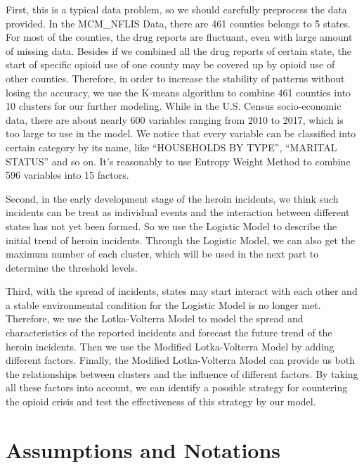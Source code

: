 \documentclass[12pt]{article}
\begin{document}
First, this is a typical data problem, so we should carefully preprocess the data provided. In the MCM\_NFLIS Data, there are 461 counties belongs to 5 states. For most of the counties, the drug reports are fluctuant, even with large amount of missing data. Besides if we combined all the drug reports of certain state, the start of specific opioid use of one county may be covered up by opioid use of other counties. Therefore, in order to increase the stability of patterns without losing the accuracy, we use the K-means algorithm to combine 461 counties into 10 clusters for our further modeling.
While in the U.S. Census socio-economic data, there are about nearly 600 variables ranging from 2010 to 2017, which is too large to use in the model. We notice that every variable can be classified into certain category by its name, like “HOUSEHOLDS BY TYPE”, “MARITAL STATUS” and so on. It’s reasonably to use Entropy Weight Method to combine 596 variables into 15 factors.

Second, in the early development stage of the heroin incidents, we think such incidents can be treat as  individual events and the interaction between different states has not yet been formed. So we use the Logistic Model to describe the initial trend of heroin incidents. Through the Logistic Model, we can also get the maximum number of each cluster, which will be used in the next part to determine the threshold levels.

Third, with the spread of incidents, states may start interact with each other and a stable environmental condition for the Logistic Model is no longer met. Therefore, we use the Lotka-Volterra Model to model the spread and characteristics of the reported incidents and forecast the future trend of the heroin incidents. Then we use the Modified Lotka-Volterra Model by adding different factors.
Finally, the Modified Lotka-Volterra Model can provide us both the relationships between clusters and the influence of different factors. By taking all these factors into account, we can identify a possible strategy for countering the opioid crisis and test the effectiveness of this strategy by our model.


\section{Assumptions and Notations}
\end{document}
